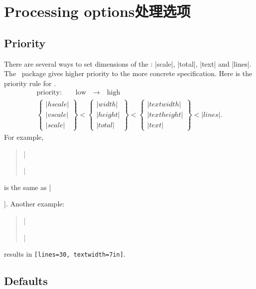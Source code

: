 
 \section{Processing options\hfill 处理选项}\label{sec:process}
 
% 
% 




 \subsection{Priority}\label{sec:priority}
  
 There are several ways to set dimensions of the :
 |scale|, |total|, |text| and |lines|. The \Gm\ package gives higher
 priority to the more concrete specification. Here is the priority
 rule for .
 \[\begin{array}{c}
 \textrm{priority:}\qquad\textrm{low}\quad
    \longrightarrow\quad\textrm{high}\\[1em]
 \left\{\begin{array}{l}|hscale|\\|vscale|\\|scale|
        \end{array}\right\} <
 \left\{\begin{array}{l}|width|\\|height|\\|total|
        \end{array}\right\} <
 \left\{\begin{array}{l}|textwidth|\\|textheight|
         \\|text|\end{array}\right\} < |lines|.
 \end{array}\]
 For example, 
 \begin{quote}
  |\usepackage[hscale=0.8, textwidth=7in, width=18cm]{geometry}|
 \end{quote}
 is the same as |\usepackage[textwidth=7in]{geometry}|. Another example:
 \begin{quote}
  |\usepackage[lines=30, scale=0.8, text=7in]{geometry}|
 \end{quote}
 results in \texttt{[lines=30, textwidth=7in]}.

 \subsection{Defaults}\label{sec:defaults}

